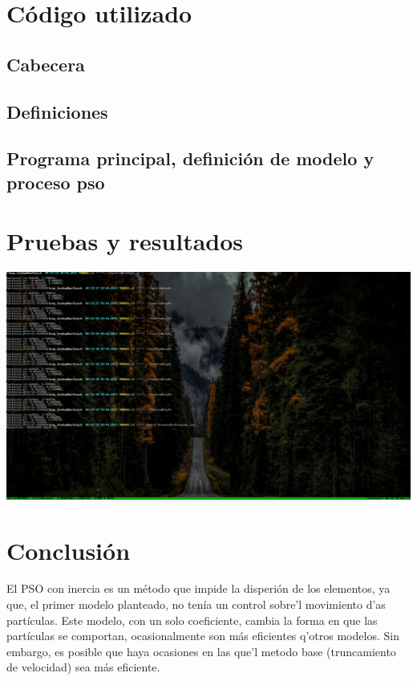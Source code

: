 \documentclass[12pt,letterpaper]{report}
\begin{document}
  \section*{Código utilizado}
  \subsection*{Cabecera}
  
  \subsection*{Definiciones}
  
  \subsection*{Programa principal, definición de modelo y proceso pso}
  
  \section*{Pruebas y resultados}
  \includegraphics[scale=0.45,trim= 0 7cm 38cm 0,clip]{../PruebasDelPrograma}
  \section*{Conclusión}
  El PSO con inercia es un método que impide la disperión de los elementos, ya que,
  el primer modelo planteado, no tenía un control sobre'l movimiento d'as partículas.
  Este modelo, con un solo coeficiente, cambia la forma en que las partículas se comportan,
  ocasionalmente son más eficientes q'otros modelos. Sin embargo, es posible que haya ocasiones
  en las que'l metodo base (truncamiento de velocidad) sea más eficiente.
\end{document}
